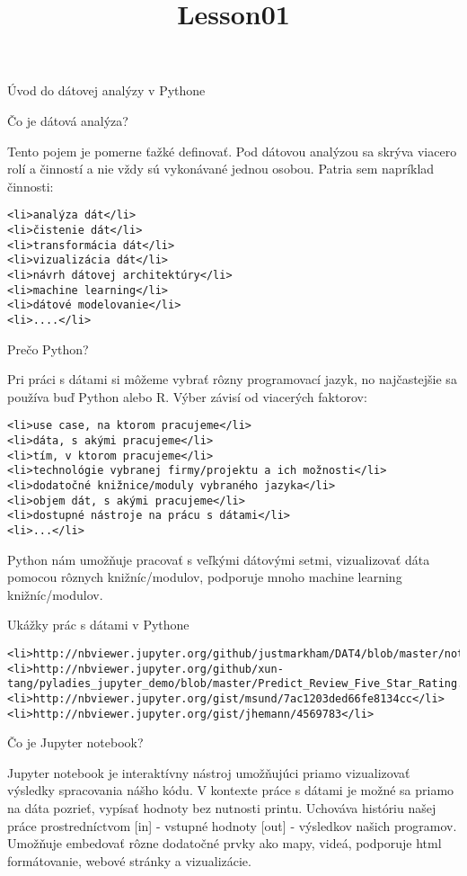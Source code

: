 \documentclass[11pt]{article}
\title{Lesson01}
\begin{document}
    
    
    \maketitle
    
    

    
    Úvod do dátovej analýzy v Pythone

    Čo je dátová analýza?

Tento pojem je pomerne ťažké definovať. Pod dátovou analýzou sa skrýva
viacero rolí a činností a nie vždy sú vykonávané jednou osobou. Patria
sem napríklad činnosti:

\begin{verbatim}
<li>analýza dát</li>
<li>čistenie dát</li>
<li>transformácia dát</li>
<li>vizualizácia dát</li>
<li>návrh dátovej architektúry</li>
<li>machine learning</li>
<li>dátové modelovanie</li>
<li>....</li>
\end{verbatim}

    Prečo Python?

Pri práci s dátami si môžeme vybrať rôzny programovací jazyk, no
najčastejšie sa používa buď Python alebo R. Výber závisí od viacerých
faktorov:

\begin{verbatim}
<li>use case, na ktorom pracujeme</li>
<li>dáta, s akými pracujeme</li>
<li>tím, v ktorom pracujeme</li>
<li>technológie vybranej firmy/projektu a ich možnosti</li>
<li>dodatočné knižnice/moduly vybraného jazyka</li>
<li>objem dát, s akými pracujeme</li>
<li>dostupné nástroje na prácu s dátami</li>
<li>...</li>
\end{verbatim}

Python nám umožňuje pracovať s veľkými dátovými setmi, vizualizovať dáta
pomocou rôznych knižníc/modulov, podporuje mnoho machine learning
knižníc/modulov.

Ukážky prác s dátami v Pythone

    \begin{verbatim}
<li>http://nbviewer.jupyter.org/github/justmarkham/DAT4/blob/master/notebooks/08_linear_regression.ipynb</li>
<li>http://nbviewer.jupyter.org/github/xun-tang/pyladies_jupyter_demo/blob/master/Predict_Review_Five_Star_Rating.ipynb</li>
<li>http://nbviewer.jupyter.org/gist/msund/7ac1203ded66fe8134cc</li>
<li>http://nbviewer.jupyter.org/gist/jhemann/4569783</li>
\end{verbatim}

    Čo je Jupyter notebook?

Jupyter notebook je interaktívny nástroj umožňujúci priamo vizualizovať
výsledky spracovania nášho kódu. V kontexte práce s dátami je možné sa
priamo na dáta pozrieť, vypísať hodnoty bez nutnosti printu. Uchováva
históriu našej práce prostredníctvom {[}in{]} - vstupné hodnoty
{[}out{]} - výsledkov našich programov. Umožňuje embedovať rôzne
dodatočné prvky ako mapy, videá, podporuje html formátovanie, webové
stránky a vizualizácie.
\end{document}
